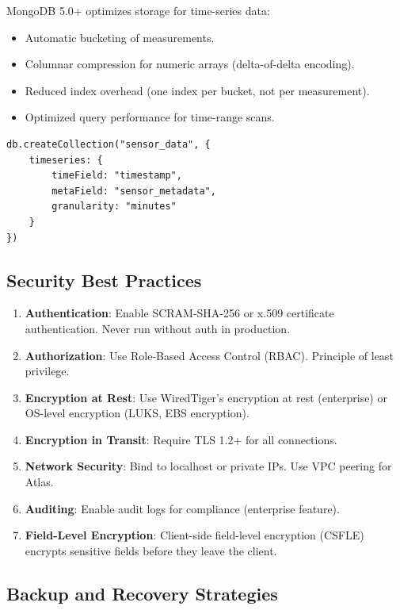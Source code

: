 \documentclass[12pt,a4paper]{article}
\begin{document}
MongoDB 5.0+ optimizes storage for time-series data:
\begin{itemize}[noitemsep]
    \item Automatic bucketing of measurements.
    \item Columnar compression for numeric arrays (delta-of-delta encoding).
    \item Reduced index overhead (one index per bucket, not per measurement).
    \item Optimized query performance for time-range scans.
\end{itemize}

\begin{lstlisting}[language=MongoDB]
db.createCollection("sensor_data", {
    timeseries: {
        timeField: "timestamp",
        metaField: "sensor_metadata",
        granularity: "minutes"
    }
})
\end{lstlisting}

\subsection{Security Best Practices}

\begin{enumerate}[noitemsep]
    \item \textbf{Authentication}: Enable SCRAM-SHA-256 or x.509 certificate authentication. Never run without auth in production.
    \item \textbf{Authorization}: Use Role-Based Access Control (RBAC). Principle of least privilege.
    \item \textbf{Encryption at Rest}: Use WiredTiger's encryption at rest (enterprise) or OS-level encryption (LUKS, EBS encryption).
    \item \textbf{Encryption in Transit}: Require TLS 1.2+ for all connections.
    \item \textbf{Network Security}: Bind to localhost or private IPs. Use VPC peering for Atlas.
    \item \textbf{Auditing}: Enable audit logs for compliance (enterprise feature).
    \item \textbf{Field-Level Encryption}: Client-side field-level encryption (CSFLE) encrypts sensitive fields before they leave the client.
\end{enumerate}

\subsection{Backup and Recovery Strategies}
\end{document}
